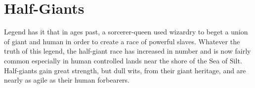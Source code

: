 \section{Half-Giants}

Legend has it that in ages past, a sorcerer-queen used wizardry to beget a union of giant and human in order to create a race of powerful slaves. Whatever the truth of this legend, the half-giant race has increased in number and is now fairly common especially in human controlled lands near the shore of the Sea of Silt. Half-giants gain great strength, but dull wits, from their giant heritage, and are nearly as agile as their human forbearers.

